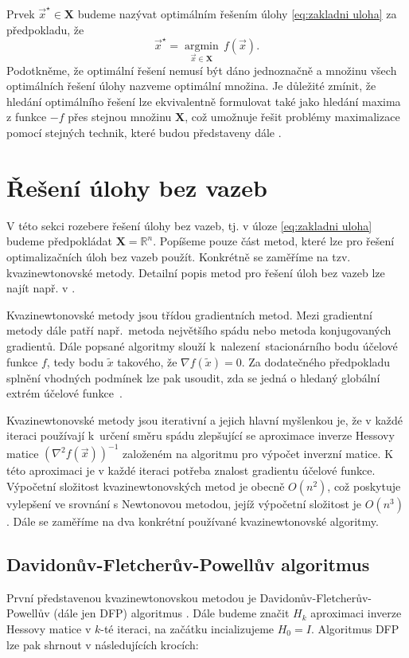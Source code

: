 Prvek $ \vec{x}^{\star} \in  \mathbf{X} $ budeme nazývat optimálním řešením úlohy \eqref{eq:zakladni uloha} za předpokladu, že
\begin{equation}
	\vec{x}^{\star} = \operatorname*{argmin}_{\vec{x} \in \mathbf{X}} \, f(\vec{x}).
\end{equation}
Podotkněme, že optimální řešení nemusí být dáno jednoznačně a množinu všech optimálních řešení úlohy nazveme optimální množina. Je důležité zmínit, že hledání optimálního řešení lze ekvivalentně formulovat také jako hledání maxima z funkce $ -f $ přes stejnou množinu $ \mathbf{X}$, což umožnuje řešit problémy maximalizace pomocí stejných technik, které budou představeny dále \cite{Bert, non-linear-textbook}.

\section{Řešení úlohy bez vazeb}\label{unconstrained}

V této sekci rozebere řešení úlohy bez vazeb, tj. v úloze \eqref{eq:zakladni uloha} budeme předpokládat 
$ \mathbf{X} = \mathbb{R}^n $. Popíšeme pouze část metod, které lze pro řešení optimalizačních úloh bez vazeb použít. Konkrétně se zaměříme na tzv. kvazinewtonovské metody. Detailní popis metod pro řešení úloh bez vazeb lze najít např. v \cite{non-linear-textbook}.

Kvazinewtonovské metody jsou třídou gradientních metod. Mezi gradientní metody dále patří např.~metoda největšího spádu nebo metoda konjugovaných gradientů. Dále popsané algoritmy slouží k~nalezení~stacionárního bodu účelové funkce $ f $, tedy bodu $ \tilde{x} $ takového, že $ \nabla f(\tilde{x}) = 0 $. Za dodatečného předpokladu splnění vhodných podmínek lze pak usoudit, zda se jedná o hledaný globální extrém účelové funkce~\cite{Bert, non-linear-textbook}.

Kvazinewtonovské metody jsou iterativní a jejich hlavní myšlenkou je, že v každé iteraci používají k~určení směru spádu zlepšující se aproximace inverze Hessovy matice $ (\nabla ^2 f(\vec{x}))^{-1} $ založeném na algoritmu pro výpočet inverzní matice. K této aproximaci je v každé iteraci potřeba znalost gradientu účelové funkce. Výpočetní složitost kvazinewtonovských metod je obecně $ O(n^2) $, což poskytuje vylepšení ve srovnání s Newtonovou metodou, jejíž výpočetní složitost je $ O(n^3) $ \cite{non-linear-textbook}. Dále se zaměříme na dva konkrétní používané kvazinewtonovské algoritmy.

\subsection{Davidonův-Fletcherův-Powellův algoritmus}\label{DFP}
První představenou kvazinewtonovskou metodou je Davidonův-Fletcherův-Powellův (dále jen DFP) algoritmus \cite{Fletcher1963}. Dále budeme značit $ H_k $ aproximaci inverze Hessovy matice v $ k $-té iteraci, na začátku incializujeme $ H_0 = I $. Algoritmus DFP lze pak shrnout v následujících krocích:

